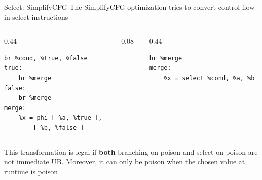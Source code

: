 \begin{frame}[fragile]{Select: SimplifyCFG}
The SimplifyCFG optimization tries to convert control flow in select instructions
    \begin{columns}[c]
        \begin{column}{0.44\textwidth}
            \begin{lstlisting}[style=llvmmono]
    br %cond, %true, %false
true:
    br %merge
false:
    br %merge
merge:
    %x = phi [ %a, %true ], 
        [ %b, %false ]
            \end{lstlisting}
        \end{column}
        \begin{column}{0.08\textwidth}
            \transform
        \end{column}
        \begin{column}{0.44\textwidth}
            \begin{lstlisting}[style=llvmmono]
    br %merge
merge:
    %x = select %cond, %a, %b
            \end{lstlisting}
        \end{column}
    \end{columns}
This transformation is legal if \textbf{both} branching on poison and select on poison are not immediate UB. Moreover, it can only be poison when the chosen value at runtime is poison
\end{frame}
